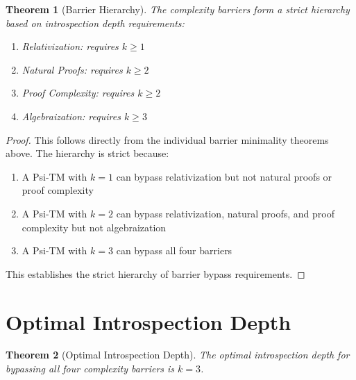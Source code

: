 \documentclass[11pt]{article}
\newtheorem{theorem}{Theorem}
\begin{document}
\begin{theorem}[Barrier Hierarchy]
The complexity barriers form a strict hierarchy based on introspection depth requirements:
\begin{enumerate}
\item Relativization: requires $k \geq 1$
\item Natural Proofs: requires $k \geq 2$
\item Proof Complexity: requires $k \geq 2$
\item Algebraization: requires $k \geq 3$
\end{enumerate}
\end{theorem}

\begin{proof}
This follows directly from the individual barrier minimality theorems above. The hierarchy is strict because:

\begin{enumerate}
\item A Psi-TM with $k = 1$ can bypass relativization but not natural proofs or proof complexity
\item A Psi-TM with $k = 2$ can bypass relativization, natural proofs, and proof complexity but not algebraization
\item A Psi-TM with $k = 3$ can bypass all four barriers
\end{enumerate}

This establishes the strict hierarchy of barrier bypass requirements.
\end{proof}

\section{Optimal Introspection Depth}

\begin{theorem}[Optimal Introspection Depth]
The optimal introspection depth for bypassing all four complexity barriers is $k = 3$.
\end{theorem}
\end{document}
